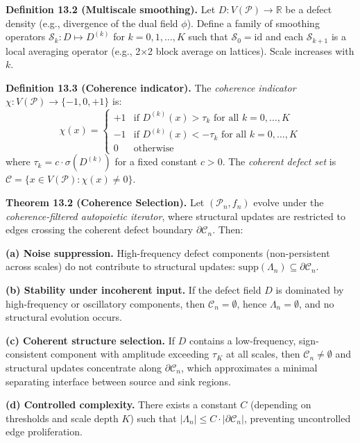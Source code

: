 \documentclass[
]{article}
\begin{document}
\textbf{Definition 13.2 (Multiscale smoothing).} Let
\(D: V(\mathcal{P}) \to \mathbb{R}\) be a defect density (e.g.,
divergence of the dual field \(\phi\)). Define a family of smoothing
operators \(\mathcal{S}_k: D \mapsto D^{(k)}\) for
\(k = 0, 1, \ldots, K\) such that \(\mathcal{S}_0 = \mathrm{id}\) and
each \(\mathcal{S}_{k+1}\) is a local averaging operator (e.g., 2×2
block average on lattices). Scale increases with \(k\).

\textbf{Definition 13.3 (Coherence indicator).} The \emph{coherence
indicator} \(\chi: V(\mathcal{P}) \to \{-1, 0, +1\}\) is:
\[\chi(x) = \begin{cases} +1 & \text{if } D^{(k)}(x) > \tau_k \text{ for all } k = 0, \ldots, K \\ -1 & \text{if } D^{(k)}(x) < -\tau_k \text{ for all } k = 0, \ldots, K \\ 0 & \text{otherwise} \end{cases}\]
where \(\tau_k = c \cdot \sigma(D^{(k)})\) for a fixed constant
\(c > 0\). The \emph{coherent defect set} is
\(\mathcal{C} = \{x \in V(\mathcal{P}) : \chi(x) \neq 0\}\).

\textbf{Theorem 13.2 (Coherence Selection).} Let
\((\mathcal{P}_n, f_n)\) evolve under the \emph{coherence-filtered
autopoietic iterator}, where structural updates are restricted to edges
crossing the coherent defect boundary \(\partial\mathcal{C}_n\). Then:

\textbf{(a) Noise suppression.} High-frequency defect components
(non-persistent across scales) do not contribute to structural updates:
\(\mathrm{supp}(\Lambda_n) \subseteq \partial\mathcal{C}_n\).

\textbf{(b) Stability under incoherent input.} If the defect field \(D\)
is dominated by high-frequency or oscillatory components, then
\(\mathcal{C}_n = \emptyset\), hence \(\Lambda_n = \emptyset\), and no
structural evolution occurs.

\textbf{(c) Coherent structure selection.} If \(D\) contains a
low-frequency, sign-consistent component with amplitude exceeding
\(\tau_K\) at all scales, then \(\mathcal{C}_n \neq \emptyset\) and
structural updates concentrate along \(\partial\mathcal{C}_n\), which
approximates a minimal separating interface between source and sink
regions.

\textbf{(d) Controlled complexity.} There exists a constant \(C\)
(depending on thresholds and scale depth \(K\)) such that
\(|\Lambda_n| \leq C \cdot |\partial\mathcal{C}_n|\), preventing
uncontrolled edge proliferation.
\end{document}
